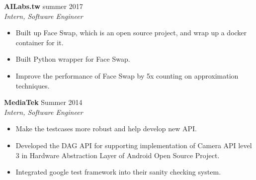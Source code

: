 \documentclass[margin, 9pt]{res} %
\begin{document}
\begin{resume}
{\textbf{AILabs.tw}} \hfill{summer 2017}\\
{\textit{Intern, Software Engineer}}
\begin{itemize}[leftmargin=*] \itemsep -3pt
\vspace*{-5pt}
  \item Built up Face Swap, which is an open source project, and wrap up a docker
  container for it.
	\item Built Python wrapper for Face Swap.
	\item Improve the performance of Face Swap by 5x counting on approximation
  techniques.
\end{itemize}

\medskip
{\textbf{MediaTek}} \hfill{Summer 2014}\\
{\textit{Intern, Software Engineer}}
\begin{itemize}[leftmargin=*] \itemsep -3pt
\vspace*{-5pt}
  \item Make the testcases more robust and help develop new API.
	\item Developed the DAG API for supporting implementation of Camera API level
  3 in Hardware Abstraction Layer of Android Open Source Project.
	\item Integrated google test framework into their sanity checking system.
\end{itemize}



\end{resume}
\end{document}
